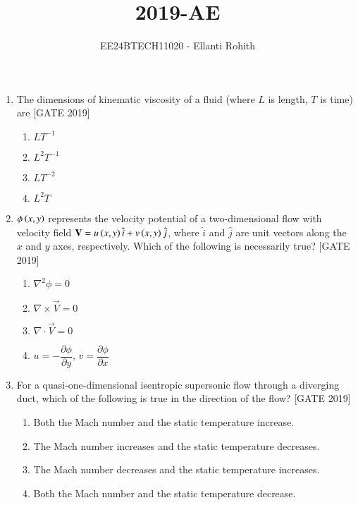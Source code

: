 \documentclass[journal,12pt,onecolumn]{IEEEtran}
\theoremstyle{remark}
\begin{document}

\vspace{3cm}

\title{2019-AE}
\author{EE24BTECH11020 -  Ellanti Rohith}
\maketitle

\renewcommand{\thefigure}{\theenumi}
\renewcommand{\thetable}{\theenumi}
\begin{enumerate}

    \item The dimensions of kinematic viscosity of a fluid (where $L$ is length, $T$ is time) are
    \hfill{[GATE 2019]}
    \begin{multicols}{4}
        \begin{enumerate}
            \item $LT^{-1}$
            \item $L^2T^{-1}$
            \item $LT^{-2}$
            \item $L^2T$
        \end{enumerate}
    \end{multicols}

    \item $\phi\left(x, y\right)$ represents the velocity potential of a two-dimensional flow with velocity field $\mathbf{V} = u\left(x, y\right) \hat{i} + v\left(x, y\right) \hat{j}$, where $\hat{i}$ and $\hat{j}$ are unit vectors along the $x$ and $y$ axes, respectively. Which of the following is necessarily true?
    \hfill{[GATE 2019]}
    \begin{multicols}{2}
        \begin{enumerate}
            \item $\nabla^2 \phi = 0$
            \item $\nabla \times \vec{V} = 0$
            \item $\nabla \cdot \vec{V} = 0$
            \item $u = -\dfrac{\partial \phi}{\partial y}, \, v = \dfrac{\partial \phi}{\partial x}$
        \end{enumerate}
    \end{multicols}

    \item For a quasi-one-dimensional isentropic supersonic flow through a diverging duct, which of the following is true in the direction of the flow?
    \hfill{[GATE 2019]}

        \begin{enumerate}
            \item Both the Mach number and the static temperature increase.
            \item The Mach number increases and the static temperature decreases.
            \item The Mach number decreases and the static temperature increases.
            \item Both the Mach number and the static temperature decrease.\\
        \end{enumerate}
        

\end{enumerate}
\end{document}
